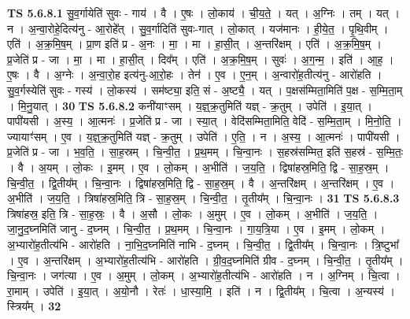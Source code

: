\documentclass[17pt]{extarticle}
\begin{document}
                                \textbf{ TS 5.6.8.1} \newline
                  सु॒व॒र्गायेति॑ सुवः - गाय॑ । वै । ए॒षः । लो॒काय॑ । ची॒य॒ते॒ । यत् । अ॒ग्निः । तम् । यत् । न । अ॒न्वा॒रोहे॒दित्य॑नु - आ॒रोहे᳚त् । सु॒व॒र्गादिति॑ सुवः-गात् । लो॒कात् । यज॑मानः । ही॒ये॒त॒ । पृ॒थि॒वीम् । एति॑ । अ॒क्र॒मि॒ष॒म् । प्रा॒ण इति॑ प्र - अ॒नः । मा॒ । मा । हा॒सी॒त् । अ॒न्तरि॑क्षम् । एति॑ । अ॒क्र॒मि॒ष॒म् । प्र॒जेति॑ प्र - जा । मा॒ । मा । हा॒सी॒त् । दिव᳚म् । एति॑ । अ॒क्र॒मि॒ष॒म् । सुवः॑ । अ॒ग॒न्म॒ । इति॑ । आ॒ह॒ । ए॒षः । वै । अ॒ग्नेः । अ॒न्वा॒रो॒ह इत्य॑नु-आ॒रो॒हः । तेन॑ । ए॒व । ए॒न॒म् । अ॒न्वारो॑ह॒तीत्य॑नु - आरो॑हति । सु॒व॒र्गस्येति॑ सुवः - गस्य॑ । लो॒कस्य॑ । सम॑ष्ट्या॒ इति॒ सं - अ॒ष्ट्यै॒ । यत् । प॒क्षस॑म्मिता॒मिति॑ प॒क्ष - स॒म्मि॒ता॒म् । मि॒नु॒यात् । \textbf{  30} \newline
                  \newline
                                \textbf{ TS 5.6.8.2} \newline
                  कनी॑याꣳसम् । य॒ज्ञ्॒क्र॒तुमिति॑ यज्ञ् - क्र॒तुम् । उपेति॑ । इ॒या॒त् । पापी॑यसी । अ॒स्य॒ । आ॒त्मनः॑ । प्र॒जेति॑ प्र - जा । स्या॒त् । वेदि॑सम्मिता॒मिति॒ वेदि॑ - स॒म्मि॒ता॒म् । मि॒नो॒ति॒ । ज्यायाꣳ॑सम् । ए॒व । य॒ज्ञ्॒क्र॒तुमिति॑ यज्ञ् - क्र॒तुम् । उपेति॑ । ए॒ति॒ । न । अ॒स्य॒ । आ॒त्मनः॑ । पापी॑यसी । प्र॒जेति॑ प्र - जा । भ॒व॒ति॒ । सा॒ह॒स्रम् । चि॒न्वी॒त॒ । प्र॒थ॒मम् । चि॒न्वा॒नः । स॒हस्र॑सम्मित॒ इति॑ स॒हस्र॑ - स॒म्मि॒तः॒ । वै । अ॒यम् । लो॒कः ।   इ॒मम् । ए॒व । लो॒कम् । अ॒भीति॑ । ज॒य॒ति॒ । द्विषा॑हस्र॒मिति॒ द्वि - सा॒ह॒स्र॒म् । चि॒न्वी॒त॒ । द्वि॒तीय᳚म् । चि॒न्वा॒नः । द्विषा॑हस्र॒मिति॒ द्वि - सा॒ह॒स्र॒म् । वै । अ॒न्तरि॑क्षम् । अ॒न्तरि॑क्षम् । ए॒व । अ॒भीति॑ । ज॒य॒ति॒ । त्रिषा॑हस्र॒मिति॒ त्रि - सा॒ह॒स्र॒म् । चि॒न्वी॒त॒ । तृ॒तीय᳚म् । चि॒न्वा॒नः । \textbf{  31} \newline
                  \newline
                                \textbf{ TS 5.6.8.3} \newline
                  त्रिषा॑हस्र॒ इति॒ त्रि - सा॒ह॒स्रः॒ । वै । अ॒सौ । लो॒कः । अ॒मुम् । ए॒व । लो॒कम् । अ॒भीति॑ । ज॒य॒ति॒ । जा॒नु॒द॒घ्नमिति॑ जानु - द॒घ्नम् । चि॒न्वी॒त॒ । प्र॒थ॒मम् । चि॒न्वा॒नः । गा॒य॒त्रि॒या । ए॒व । इ॒मम् । लो॒कम् । अ॒भ्यारो॑ह॒तीत्य॑भि - आरो॑हति । ना॒भि॒द॒घ्नमिति॑ नाभि - द॒घ्नम् । चि॒न्वी॒त॒ ।  द्वि॒तीय᳚म् । चि॒न्वा॒नः । त्रि॒ष्टुभा᳚ । ए॒व । अ॒न्तरि॑क्षम् । अ॒भ्यारो॑ह॒तीत्य॑भि - आरो॑हति । ग्री॒व॒द॒घ्नमिति॑ ग्रीव - द॒घ्नम् । चि॒न्वी॒त॒ । तृ॒तीय᳚म् । चि॒न्वा॒नः । जग॑त्या । ए॒व । अ॒मुम् ।  लो॒कम् । अ॒भ्यारो॑ह॒तीत्य॑भि - आरो॑हति । न । अ॒ग्निम् । चि॒त्वा । रा॒माम् । उपेति॑ । इ॒या॒त् । अ॒यो॒नौ । रेतः॑ । धा॒स्या॒मि॒ । इति॑ । न । द्वि॒तीय᳚म् । चि॒त्वा । अ॒न्यस्य॑ । स्त्रिय᳚म् । \textbf{  32} \newline
\end{document}
